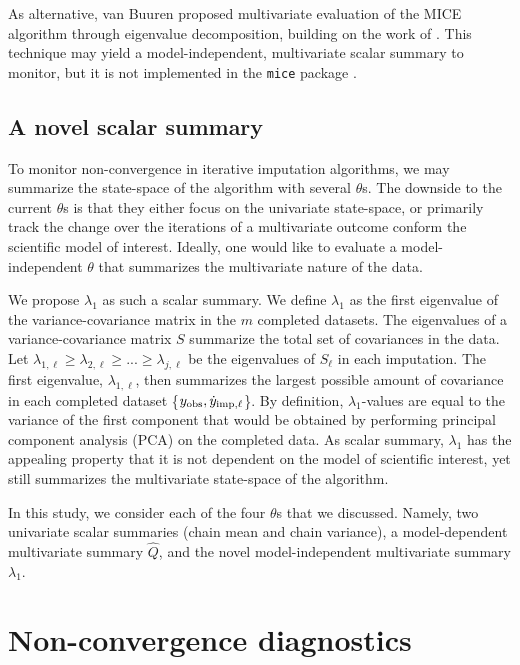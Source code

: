 \documentclass[Royal,times,sageh]{sagej}
\begin{document}
As alternative, van Buuren \citeyearpar[\(\S\) 4.5.2]{buur18} proposed multivariate evaluation of the MICE algorithm through eigenvalue decomposition, building on the work of \citet{mack03}. This technique may yield a model-independent, multivariate scalar summary to monitor, but it is not implemented in the \texttt{mice} package \citep{mice}.

\hypertarget{a-novel-scalar-summary}{%
\subsection{A novel scalar summary}\label{a-novel-scalar-summary}}

To monitor non-convergence in iterative imputation algorithms, we may summarize the state-space of the algorithm with several \(\theta\)s. The downside to the current \(\theta\)s is that they either focus on the univariate state-space, or primarily track the change over the iterations of a multivariate outcome conform the scientific model of interest. Ideally, one would like to evaluate a model-independent \(\theta\) that summarizes the multivariate nature of the data.

We propose \(\lambda_{1}\) as such a scalar summary. We define \(\lambda_{1}\) as the first eigenvalue of the variance-covariance matrix in the \(m\) completed datasets. The eigenvalues of a variance-covariance matrix \(S\) summarize the total set of covariances in the data. Let \(\lambda_{1, \ell} \geq \lambda_{2, \ell} \geq ... \geq \lambda_{j, \ell}\) be the eigenvalues of \(S_\ell\) in each imputation. The first eigenvalue, \(\lambda_{1,\ell}\), then summarizes the largest possible amount of covariance in each completed dataset \{\(y_{\rm obs}, \dot y_{\rm imp, \ell}\)\}. By definition, \(\lambda_{1}\)-values are equal to the variance of the first component that would be obtained by performing principal component analysis (PCA) on the completed data. As scalar summary, \(\lambda_{1}\) has the appealing property that it is not dependent on the model of scientific interest, yet still summarizes the multivariate state-space of the algorithm.

In this study, we consider each of the four \(\theta\)s that we discussed. Namely, two univariate scalar summaries (chain mean and chain variance), a model-dependent multivariate summary \(\hat{Q}\), and the novel model-independent multivariate summary \(\lambda_1\).

\hypertarget{non-convergence-diagnostics}{%
\section{Non-convergence diagnostics}\label{non-convergence-diagnostics}}
\end{document}
